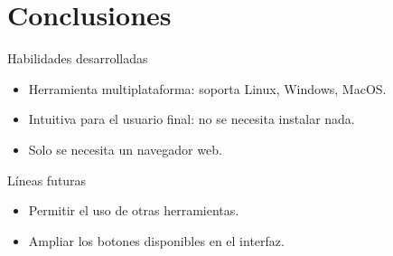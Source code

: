 \documentclass{beamer}
\begin{document}
\section{Conclusiones}
\begin{frame}
\begin{block}{Habilidades desarrolladas}
\begin{itemize}
\item Herramienta multiplataforma: soporta Linux, Windows, MacOS.
\item Intuitiva para el usuario final: no se necesita instalar nada.
\item Solo se necesita un navegador web.
\end{itemize}
\end{block}
\end{frame}
	

\begin{frame}
\begin{block}{Líneas futuras}
\begin{itemize}
\item Permitir el uso de otras herramientas.
\item Ampliar los botones disponibles en el interfaz.
\end{itemize}
\end{block}
\end{frame}

\begin{frame}[plain]
\large{\titlepage}
\end{frame}



\end{document}

